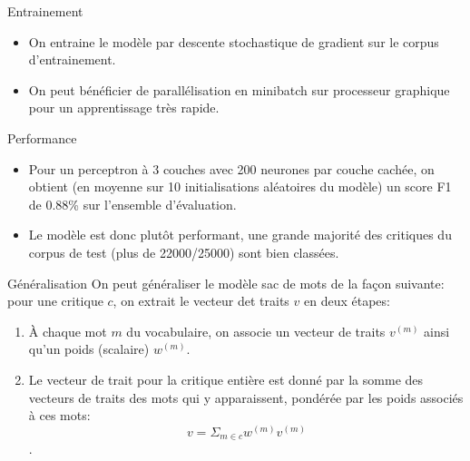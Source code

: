 \documentclass{beamer}
\begin{document}
\begin{frame}{Entrainement}
  \begin{itemize}
  \item On entraine le mod\`ele par descente stochastique de gradient sur le corpus d'entrainement.
  \item On peut b\'en\'eficier de parall\'elisation en minibatch sur processeur graphique pour un apprentissage tr\`es rapide. 
  \end{itemize}
\end{frame}

\begin{frame}{Performance}
  \begin{itemize}
  \item Pour un perceptron \`a 3 couches avec 200 neurones par couche cach\'ee, on obtient (en moyenne sur 10 initialisations al\'eatoires du mod\`ele) un score F1 de 0.88\% sur l'ensemble d'\'evaluation. 
  \item Le mod\`ele est donc plut\^ot performant, une grande majorit\'e des critiques du corpus de test (plus de 22000/25000) sont bien class\'ees. 
  \end{itemize}
\end{frame}

\begin{frame}{G\'en\'eralisation}
  On peut g\'en\'eraliser le mod\`ele sac de mots de la fa\c con suivante: pour une critique $c$, on extrait le vecteur det traits $v$ en deux \'etapes:
  \begin{enumerate}
  \item \`A chaque mot $m$ du vocabulaire, on associe un vecteur de traits $v^{(m)}$ ainsi qu'un poids (scalaire) $w^{(m)}$.
  \item Le vecteur de trait pour la critique enti\`ere est donn\'e par la somme des vecteurs de traits des mots qui y apparaissent, pond\'er\'ee par les poids associ\'es \`a ces mots: \[v = \Sigma_{m \in c} w^{(m)} v^{(m)}\]. 
  \end{enumerate}
\end{frame}
\end{document}
